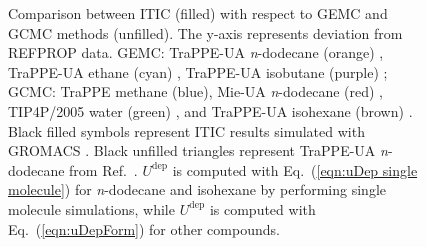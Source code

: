 \documentclass[5p,times]{elsarticle}
\begin{document}
\begin{figure}[]
\caption{Comparison between ITIC (filled) with respect to GEMC and GCMC methods (unfilled). The y-axis represents deviation from REFPROP data. 
GEMC: TraPPE-UA \textit{n}-dodecane  (orange) \cite{Martin1998}, TraPPE-UA ethane (cyan) \cite{Martin1998}, TraPPE-UA isobutane (purple) \cite{Wick2000};
GCMC: TraPPE methane\cite{Shen2008} (blue), Mie-UA \textit{n}-dodecane (red) \cite{Potoff2009}, TIP4P/2005 water (green) \cite{Shen2008}, and TraPPE-UA isohexane (brown) \cite{Mick2017}. Black filled symbols represent ITIC results simulated with GROMACS \cite{Lindahl2001}. Black unfilled triangles represent TraPPE-UA \textit{n}-dodecane from Ref.~\cite{Ungerer2000}. $U^\mathrm{dep}$ is computed with Eq.~(\ref{eqn:uDep single molecule}) for \textit{n}-dodecane and isohexane by performing single molecule simulations, while $U^\mathrm{dep}$ is computed with Eq.~(\ref{eqn:uDepForm}) for other compounds.
}
\label{fig:EXAMPLE-SIM/Deviation-Psat-rhoL-rhoV}
\end{figure}
\end{document}

